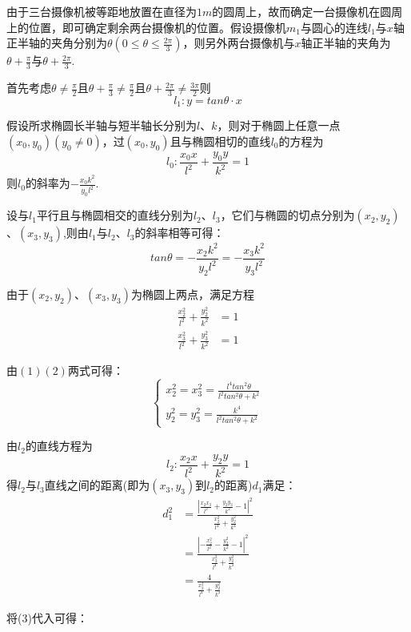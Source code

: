 \documentclass[a4paper,10.5pt]{ctexart}
\begin{document}
由于三台摄像机被等距地放置在直径为$1m$的圆周上，故而确定一台摄像机在圆周上的位置，即可确定剩余两台摄像机的位置。假设摄像机$m_1$与圆心的连线$l_1$与$x$轴正半轴的夹角分别为$\theta(0\le \theta \le \frac{2\pi}{3} )$，则另外两台摄像机与$x$轴正半轴的夹角为$\theta +\frac{\pi}{3}$与$\theta +\frac{2\pi}{3}$.
\par 首先考虑$\theta \ne \frac{\pi}{2}$且$\theta+\frac{\pi}{3} \ne \frac{\pi}{2}$且$\theta +\frac{2\pi}{3}\ne \frac{3\pi}{2}$则$$l_1:y=tan\theta\cdot x$$
\par 假设所求椭圆长半轴与短半轴长分别为$l$、$k$，则对于椭圆上任意一点$(x_0,y_0)(y_0\ne0)$，过$(x_0,y_0)$且与椭圆相切的直线$l_0$的方程为$$l_0:\frac{x_0x}{l^2}+\frac{y_0y}{k^2}=1$$则$l_0$的斜率为$-\frac{x_0k^2}{y_0l^2}$.
\par 设与$l_1$平行且与椭圆相交的直线分别为$l_2$、$l_3$，它们与椭圆的切点分别为$(x_2,y_2)$、$(x_3,y_3)$,则由$l_1$与$l_2$、$l_3$的斜率相等可得：
\begin{equation}
tan\theta=-\frac{x_2k^2}{y_2l^2}=-\frac{x_3k^2}{y_3l^2}
\end{equation}
\par 由于$(x_2,y_2)$、$(x_3,y_3)$为椭圆上两点，满足方程
\begin{equation}
\begin{align*}
\frac{x_2^2}{l^2}+\frac{y_2^2}{k^2}&=1 \\
 \frac{x_3^2}{l^2}+\frac{y_3^2}{k^2}&=1
\end{align*}
\end{equation}
\par 由$(1)(2)$两式可得：
\begin{equation}
\left\{
\begin{aligned}
x_2^2=x_3^2=\frac{l^4tan^2\theta}{l^2tan^2\theta+k^2} \\
y_2^2=y_3^2=\frac{k^4}{l^2tan^2\theta+k^2}
\end{aligned}
\right.
\end{equation}
\par 由$l_2$的直线方程为$$l_2:\frac{x_2x}{l^2}+\frac{y_2y}{k^2}=1$$
得$l_2$与$l_3$直线之间的距离(即为$(x_3,y_3)$到$l_2$的距离)$d_1$满足：
\begin{align*}
d_1^2&= \frac{|\frac{x_2x_3}{l^2}+\frac{y_2y_3}{k^2}-1|^2}{\frac{x_2^2}{l^4}+\frac{y_2^2}{k^4}}\\
 &=\frac{|-\frac{x_2^2}{l^2}-\frac{y_2^2}{k^2}-1|^2}{\frac{x_2^2}{l^4}+\frac{y_2^2}{k^4}}\\
 &=\frac{4}{\frac{x_2^2}{l^4}+\frac{y_2^2}{k^4}}
\end{align*}
\par 将(3)代入可得：
\end{document}
